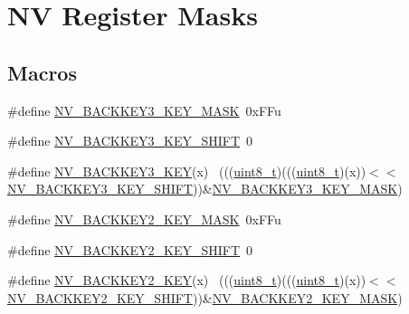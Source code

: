 \hypertarget{group___n_v___register___masks}{}\section{NV Register Masks}
\label{group___n_v___register___masks}
\subsection*{Macros}
\begin{DoxyCompactItemize}
\item 
\#define \hyperlink{group___n_v___register___masks_gabe9123bc8137627b30e4f75c757cfb95}{N\+V\+\_\+\+B\+A\+C\+K\+K\+E\+Y3\+\_\+\+K\+E\+Y\+\_\+\+M\+A\+SK}~0x\+F\+Fu
\item 
\#define \hyperlink{group___n_v___register___masks_ga78b75e37d984596ddd9053d2125a78ff}{N\+V\+\_\+\+B\+A\+C\+K\+K\+E\+Y3\+\_\+\+K\+E\+Y\+\_\+\+S\+H\+I\+FT}~0
\item 
\#define \hyperlink{group___n_v___register___masks_ga60012399e688ca410ed3d4c7f58d5f91}{N\+V\+\_\+\+B\+A\+C\+K\+K\+E\+Y3\+\_\+\+K\+EY}(x)                                          ~(((\hyperlink{_p_e___types_8h_aba7bc1797add20fe3efdf37ced1182c5}{uint8\+\_\+t})(((\hyperlink{_p_e___types_8h_aba7bc1797add20fe3efdf37ced1182c5}{uint8\+\_\+t})(x))$<$$<$\hyperlink{group___n_v___register___masks_ga78b75e37d984596ddd9053d2125a78ff}{N\+V\+\_\+\+B\+A\+C\+K\+K\+E\+Y3\+\_\+\+K\+E\+Y\+\_\+\+S\+H\+I\+FT}))\&\hyperlink{group___n_v___register___masks_gabe9123bc8137627b30e4f75c757cfb95}{N\+V\+\_\+\+B\+A\+C\+K\+K\+E\+Y3\+\_\+\+K\+E\+Y\+\_\+\+M\+A\+SK})
\item 
\#define \hyperlink{group___n_v___register___masks_ga5bf8822b0b59a321d9b5c30eb1618704}{N\+V\+\_\+\+B\+A\+C\+K\+K\+E\+Y2\+\_\+\+K\+E\+Y\+\_\+\+M\+A\+SK}~0x\+F\+Fu
\item 
\#define \hyperlink{group___n_v___register___masks_ga408b1083508e784cba76d5be9b147a84}{N\+V\+\_\+\+B\+A\+C\+K\+K\+E\+Y2\+\_\+\+K\+E\+Y\+\_\+\+S\+H\+I\+FT}~0
\item 
\#define \hyperlink{group___n_v___register___masks_ga5641a6e4f33b369fdcbefa85524b0610}{N\+V\+\_\+\+B\+A\+C\+K\+K\+E\+Y2\+\_\+\+K\+EY}(x)                                          ~(((\hyperlink{_p_e___types_8h_aba7bc1797add20fe3efdf37ced1182c5}{uint8\+\_\+t})(((\hyperlink{_p_e___types_8h_aba7bc1797add20fe3efdf37ced1182c5}{uint8\+\_\+t})(x))$<$$<$\hyperlink{group___n_v___register___masks_ga408b1083508e784cba76d5be9b147a84}{N\+V\+\_\+\+B\+A\+C\+K\+K\+E\+Y2\+\_\+\+K\+E\+Y\+\_\+\+S\+H\+I\+FT}))\&\hyperlink{group___n_v___register___masks_ga5bf8822b0b59a321d9b5c30eb1618704}{N\+V\+\_\+\+B\+A\+C\+K\+K\+E\+Y2\+\_\+\+K\+E\+Y\+\_\+\+M\+A\+SK})

\end{DoxyCompactItemize}
